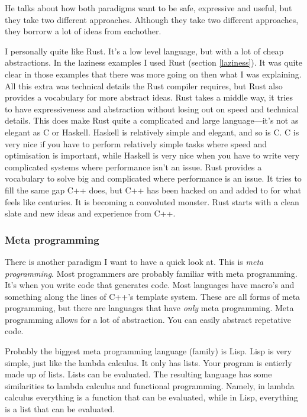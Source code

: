 \documentclass[11pt]{article}
\begin{document}
He talks about how both paradigms want to be safe, expressive and useful, but
they take two different approaches. Although they take two different
approaches, they borrorw a lot of ideas from eachother.

I personally quite like Rust. It's a low level language, but with a lot of
cheap abstractions. In the laziness examples I used Rust (section
\ref{laziness}). It was quite clear in those examples that there was more going
on then what I was explaining. All this extra was technical details the Rust
compiler requires, but Rust also provides a vocabulary for more abstract ideas.
Rust takes a middle way, it tries to have expressiveness and abstraction
without losing out on speed and technical details. This does make Rust quite a
complicated and large language---it's not as elegant as C or Haskell. Haskell
is relatively simple and elegant, and so is C. C is very nice if you have to
perform relatively simple tasks where speed and optimisation is important,
while Haskell is very nice when you have to write very complicated systems
where performance isn't an issue. Rust provides a vocabulary to solve big and
complicated where performance is an issue. It tries to fill the same gap C++
does, but C++ has been hacked on and added to for what feels like centuries. It
is becoming a convoluted monster. Rust starts with a clean slate and new ideas
and experience from C++.

\subsubsection{Meta programming}\label{metaprogramming}

There is another paradigm I want to have a quick look at. This is \emph{meta
programming}. Most programmers are probably familiar with meta programming.
It's when you write code that generates code. Most languages have macro's and
something along the lines of C++'s template system. These are all forms of meta
programming, but there are languages that have \emph{only} meta programming.
Meta programming allows for a lot of abstraction. You can easily abstract
repetative code.

Probably the biggest meta programming language (family) is Lisp. Lisp is very
simple, just like the lambda calculus. It only has lists. Your program is
entierly made up of lists. Lists can be evaluated. The resulting language has
some similarities to lambda calculus and functional programming. Namely, in
lambda calculus everything is a function that can be evaluated, while in Lisp,
everything is a list that can be evaluated.
\end{document}
